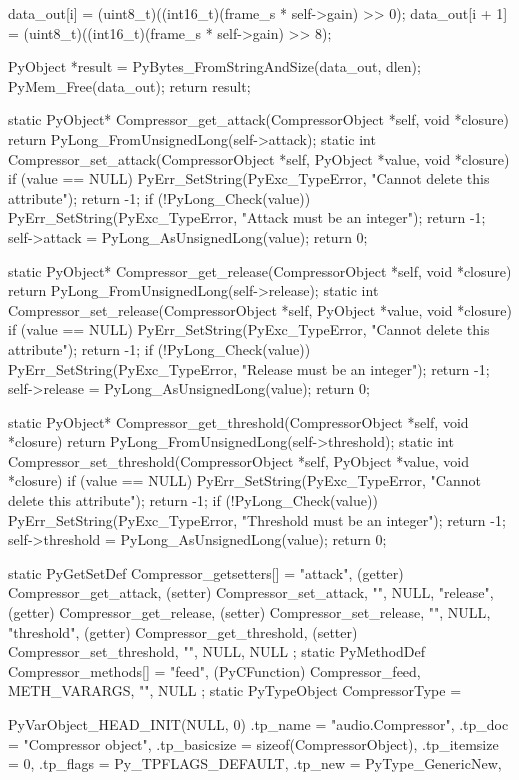 \begin{pythoncode}
{{        data_out[i] = (uint8_t)((int16_t)(frame_s * self->gain) >> 0);
        data_out[i + 1] = (uint8_t)((int16_t)(frame_s * self->gain) >> 8);
    }

    PyObject *result = PyBytes_FromStringAndSize(data_out, dlen);
    PyMem_Free(data_out);
    return result;
}

static PyObject* Compressor_get_attack(CompressorObject *self, void *closure) {
    return PyLong_FromUnsignedLong(self->attack);
}
static int Compressor_set_attack(CompressorObject *self, PyObject *value, void *closure) {
    if (value == NULL) {
        PyErr_SetString(PyExc_TypeError, "Cannot delete this attribute");
        return -1;
    }
    if (!PyLong_Check(value)) {
        PyErr_SetString(PyExc_TypeError, "Attack must be an integer");
        return -1;
    }
    self->attack = PyLong_AsUnsignedLong(value);
    return 0;
}

static PyObject* Compressor_get_release(CompressorObject *self, void *closure) {
    return PyLong_FromUnsignedLong(self->release);
}
static int Compressor_set_release(CompressorObject *self, PyObject *value, void *closure) {
    if (value == NULL) {
        PyErr_SetString(PyExc_TypeError, "Cannot delete this attribute");
        return -1;
    }
    if (!PyLong_Check(value)) {
        PyErr_SetString(PyExc_TypeError, "Release must be an integer");
        return -1;
    }
    self->release = PyLong_AsUnsignedLong(value);
    return 0;
}

static PyObject* Compressor_get_threshold(CompressorObject *self, void *closure) {
    return PyLong_FromUnsignedLong(self->threshold);
}
static int Compressor_set_threshold(CompressorObject *self, PyObject *value, void *closure) {
    if (value == NULL) {
        PyErr_SetString(PyExc_TypeError, "Cannot delete this attribute");
        return -1;
    }
    if (!PyLong_Check(value)) {
        PyErr_SetString(PyExc_TypeError, "Threshold must be an integer");
        return -1;
    }
    self->threshold = PyLong_AsUnsignedLong(value);
    return 0;
}

static PyGetSetDef Compressor_getsetters[] = {
    {"attack", (getter) Compressor_get_attack, (setter) Compressor_set_attack, "", NULL},
    {"release", (getter) Compressor_get_release, (setter) Compressor_set_release, "", NULL},
    {"threshold", (getter) Compressor_get_threshold, (setter) Compressor_set_threshold, "", NULL},
    {NULL}
};
static PyMethodDef Compressor_methods[] = {
    {"feed", (PyCFunction) Compressor_feed, METH_VARARGS, ""},
    {NULL}
};
static PyTypeObject CompressorType = {
    PyVarObject_HEAD_INIT(NULL, 0)
    .tp_name = "audio.Compressor",
    .tp_doc = "Compressor object",
    .tp_basicsize = sizeof(CompressorObject),
    .tp_itemsize = 0,
    .tp_flags = Py_TPFLAGS_DEFAULT,
    .tp_new = PyType_GenericNew,

}
\end{pythoncode}
